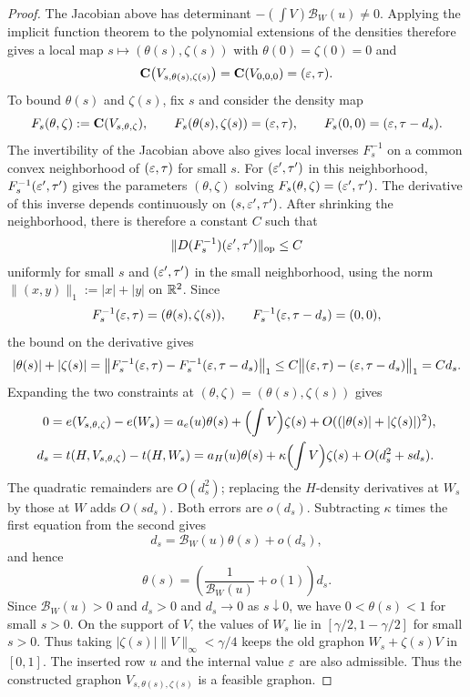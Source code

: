 \begin{proof}
The Jacobian above has determinant $-(\int V)\mathcal B_W(u)\ne0$.
Applying the implicit function theorem to the polynomial extensions
of the densities therefore gives a local map
$s\mapsto(\theta(s),\zeta(s))$ with $\theta(0)=\zeta(0)=0$ and
\[
  \mathbf C\bigl(V_{s,\theta(s),\zeta(s)}\bigr)
  =\mathbf C(V_{0,0,0})
  =(\varepsilon,\tau).
\]
To bound $\theta(s)$ and $\zeta(s)$, fix $s$ and consider the
density map
\[
  F_s(\theta,\zeta):=\mathbf C(V_{s,\theta,\zeta}),
  \qquad F_s(\theta(s),\zeta(s))=(\varepsilon,\tau),
  \qquad F_s(0,0)=(\varepsilon,\tau-d_s).
\]
The invertibility of the Jacobian above also gives local inverses
$F_s^{-1}$ on a common convex neighborhood of $(\varepsilon,\tau)$ for
small $s$. For $(\varepsilon',\tau')$
in this neighborhood, $F_s^{-1}(\varepsilon',\tau')$ gives the
parameters $(\theta,\zeta)$ solving $F_s(\theta,\zeta)=(\varepsilon',\tau')$.
The derivative of this inverse
depends continuously on $(s,\varepsilon',\tau')$. After shrinking the
neighborhood, there is therefore a constant $C$ such that
\[
  \|D(F_s^{-1})(\varepsilon',\tau')\|_{\mathrm{op}}\le C
\]
uniformly for small $s$ and $(\varepsilon',\tau')$ in the small neighborhood,
using the norm $\|(x,y)\|_1:=|x|+|y|$ on $\mathbb R^2$.  Since
\[
  F_s^{-1}(\varepsilon,\tau)=(\theta(s),\zeta(s)),
  \qquad F_s^{-1}(\varepsilon,\tau-d_s)=(0,0),
\]
the bound on the derivative gives
\[
  |\theta(s)|+|\zeta(s)|
  =\bigl\|F_s^{-1}(\varepsilon,\tau)
           -F_s^{-1}(\varepsilon,\tau-d_s)\bigr\|_1
  \le C\bigl\|(\varepsilon,\tau)-(\varepsilon,\tau-d_s)\bigr\|_1
  =Cd_s.
\]
Expanding the two constraints at $(\theta,\zeta)=(\theta(s),\zeta(s))$ gives
\begin{align*}
  0&=e(V_{s,\theta,\zeta})-e(W_s)
     =a_e(u)\theta(s)+\Bigl(\int V\Bigr)\zeta(s)+O((|\theta(s)|+|\zeta(s)|)^2),\\
  d_s&=t(H,V_{s,\theta,\zeta})-t(H,W_s)
     =a_H(u)\theta(s)+\kappa\Bigl(\int V\Bigr)\zeta(s)+O(d_s^2+s d_s).
\end{align*}
The quadratic remainders are $O(d_s^2)$; replacing the $H$-density
derivatives at $W_s$ by those at $W$ adds $O(s d_s)$.
Both errors are $o(d_s)$.
Subtracting $\kappa$ times the first equation from the second gives
\[
  d_s=\mathcal B_W(u)\theta(s)+o(d_s),
\]
and hence
\[
  \theta(s)=\left(\frac1{\mathcal B_W(u)}+o(1)\right)d_s.
\]
Since $\mathcal B_W(u)>0$ and $d_s>0$ and $d_s\to0$ as $s\downarrow0$,
we have $0<\theta(s)<1$ for small $s>0$.
On the support of $V$, the values
of $W_s$ lie in $[\gamma/2,1-\gamma/2]$ for small $s>0$.
Thus taking $|\zeta(s)|\|V\|_\infty<\gamma/4$ keeps the old
graphon $W_s+\zeta(s)V$ in $[0,1]$.
The inserted row $u$ and the internal value $\varepsilon$ are also admissible.
Thus the constructed graphon $V_{s,\theta(s),\zeta(s)}$ is a feasible graphon.


\end{proof}
